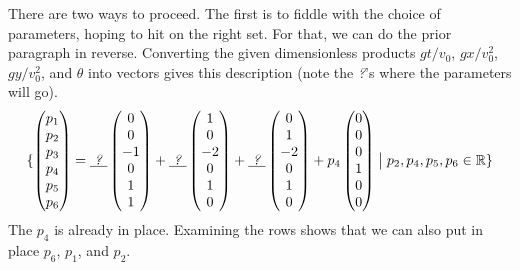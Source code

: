 \begin{exercises}
\begin{answer}
\begin{exparts}
          There are two ways to proceed.
          The first is to fiddle with the choice of parameters, hoping to
          hit on the right set.
          For that, we can do the prior paragraph in reverse.
          Converting the given dimensionless products $gt/v_0$,
          $gx/v_0^2$, $gy/v_0^2$, and $\theta$
          into vectors gives this description (note the \textit{?}'s where the
          parameters will go).
          \begin{equation*}
            \mbox{$\{\begin{pmatrix} p_1 \\ p_2 \\ p_3 \\ p_4 \\ p_5 \\ p_6 \end{pmatrix}
                =\underline{\ \text{\textit{?}}\ }
                      \begin{pmatrix} 0  \\ 0 \\ -1 \\ 0  \\ 1 \\ 1 \end{pmatrix} 
                +\underline{\ \text{\textit{?}}\ }
                   \begin{pmatrix} 1 \\ 0 \\ -2 \\ 0 \\ 1 \\ 0 \end{pmatrix} 
                +\underline{\ \text{\textit{?}}\ }
                   \begin{pmatrix} 0 \\ 1 \\ -2 \\ 0 \\ 1 \\ 0 \end{pmatrix} 
                +p_4\begin{pmatrix} 0  \\ 0 \\ 0 \\ 1 \\ 0 \\ 0 \end{pmatrix} 
                \bigm| p_2, p_4, p_5, p_6\in\mathbb{R}  \}$}
          \end{equation*}
          The $p_4$ is already in place.
          Examining the rows shows that we can also put in place $p_6$, $p_1$,
          and $p_2$.


\end{exparts}
\end{answer}
\end{exercises}
